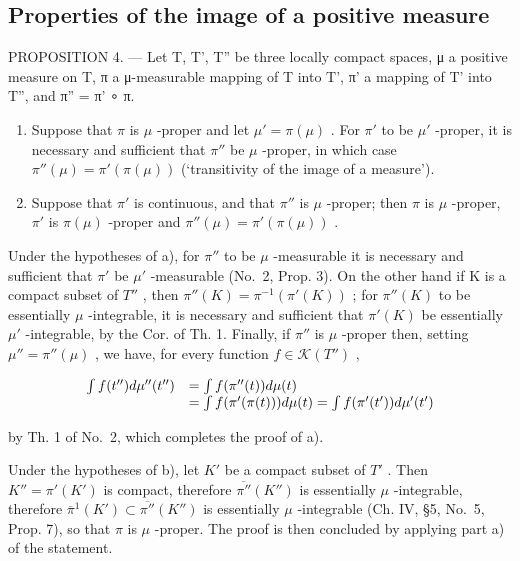 \subsection{Properties of the image of a positive measure}

PROPOSITION 4. --- Let T, T', T'' be three locally compact spaces, μ a positive measure on T, π a μ-measurable mapping of T into T', π' a mapping of T' into T'', and π'' = π' ∘ π.

\begin{enumerate}
\def\labelenumi{\alph{enumi})}
\item
  Suppose that \(\pi\) is \(\mu\) -proper and let \(\mu' = \pi(\mu)\) . For \(\pi'\) to be \(\mu'\) -proper, it is necessary and sufficient that \(\pi''\) be \(\mu\) -proper, in which case \(\pi''(\mu) = \pi'(\pi(\mu))\) (`transitivity of the image of a measure').
\item
  Suppose that \(\pi'\) is continuous, and that \(\pi''\) is \(\mu\) -proper; then \(\pi\) is \(\mu\) -proper, \(\pi'\) is \(\pi(\mu)\) -proper and \(\pi''(\mu) = \pi'(\pi(\mu))\) .
\end{enumerate}

Under the hypotheses of a), for \(\pi''\) to be \(\mu\) -measurable it is necessary and sufficient that \(\pi'\) be \(\mu'\) -measurable (No.~2, Prop. 3). On the other hand if K is a compact subset of \(T''\) , then \(\pi''(K) = \pi^{-1}(\pi'(K))\) ; for \(\pi''(K)\) to be essentially \(\mu\) -integrable, it is necessary and sufficient that \(\pi'(K)\) be essentially \(\mu'\) -integrable, by the Cor. of Th. 1. Finally, if \(\pi''\) is \(\mu\) -proper then, setting \(\mu'' = \pi''(\mu)\) , we have, for every function \(f \in \mathcal{K}(T'')\) ,

\[
\begin{array}{r l} \int f (t ^ {\prime \prime}) d \mu^ {\prime \prime} (t ^ {\prime \prime}) & = \int f (\pi^ {\prime \prime} (t)) d \mu (t) \\ & = \int f (\pi^ {\prime} (\pi (t))) d \mu (t) = \int f (\pi^ {\prime} (t ^ {\prime})) d \mu^ {\prime} (t ^ {\prime}) \end{array}
\]

by Th. 1 of No.~2, which completes the proof of a).

Under the hypotheses of b), let \(K'\) be a compact subset of \(T'\) . Then \(K'' = \pi'(K')\) is compact, therefore \(\overline{\pi''}(K'')\) is essentially \(\mu\) -integrable, therefore \(\overline{\pi}^{1}(K') \subset \overline{\pi''}(K'')\) is essentially \(\mu\) -integrable (Ch. IV, §5, No.~5, Prop. 7), so that \(\pi\) is \(\mu\) -proper. The proof is then concluded by applying part a) of the statement.

